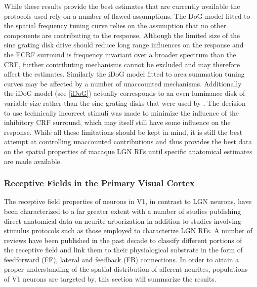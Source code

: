 While these results provide the best estimates that are currently
available the protocols used rely on a number of flawed
assumptions. The DoG model fitted to the spatial frequency tuning
curve relies on the assumption that no other components are
contributing to the response. Although the limited size of the sine
grating disk drive should reduce long range influences on the response
and the ECRF surround is frequency invariant over a broader spectrum
than the CRF, further contributing mechanisms cannot be excluded and
may therefore affect the estimates. Similarly the iDoG model fitted to
area summation tuning curves may be affected by a number of
unaccounted mechanisms. Additionally the iDoG model (see \ref{iDoG})
actually corresponds to an even luminance disk of variable size rather
than the sine grating disks that were used by \cite{Sceniak2006}. The
decision to use technically incorrect stimuli was made to minimize the
influence of the inhibitory CRF surround, which may itself still have
some influence on the response.  While all these limitations should be
kept in mind, it is still the best attempt at controlling unaccounted
contributions and thus provides the best data on the spatial
properties of macaque LGN RFs until specific anatomical estimates are
made available.

\subsubsection{Receptive Fields in the Primary Visual Cortex}


The receptive field properties of neurons in V1, in contrast to LGN
neurons, have been characterized to a far greater extent with a number
of studies publishing direct anatomical data on neurite arborization
in addition to studies involving stimulus protocols such as those
employed to characterize LGN RFs. A number of reviews have been
published in the past decade to classify different portions of the
receptive field and link them to their physiological substrate in the
form of feedforward (FF), lateral and feedback (FB) connections. In
order to attain a proper understanding of the spatial distribution of
afferent neurites, populations of V1 neurons are targeted by, this
section will summarize the results.

